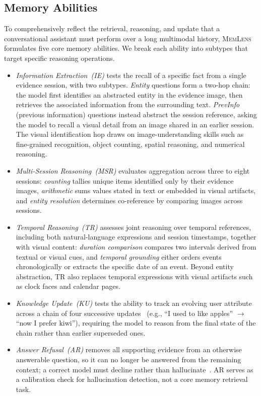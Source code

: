 \documentclass{article}
\newcommand{\bench}{\textsc{MemLens}}
\begin{document}
\subsection{Memory Abilities}
\label{subsec:formulation}
To comprehensively reflect the retrieval, reasoning, and update that a conversational assistant must perform over a long multimodal history, \bench{} formulates five core memory abilities. We break each ability into subtypes that target specific reasoning operations.
\begin{itemize}
    \item \textit{Information Extraction~(IE)} tests the recall of a specific fact from a single evidence session, with two subtypes. \emph{Entity} questions form a two-hop chain: the model first identifies an abstracted entity in the evidence image, then retrieves the associated information from the surrounding text. \emph{PrevInfo} (previous information) questions instead abstract the session reference, asking the model to recall a visual detail from an image shared in an earlier session. The visual identification hop draws on image-understanding skills such as fine-grained recognition, object counting, spatial reasoning, and numerical reasoning.
    \item \textit{Multi-Session Reasoning~(MSR)} evaluates aggregation across three to eight sessions: \emph{counting} tallies unique items identified only by their evidence images, \emph{arithmetic} sums values stated in text or embedded in visual artifacts, and \emph{entity resolution} determines co-reference by comparing images across sessions.
    \item \textit{Temporal Reasoning~(TR)} assesses joint reasoning over temporal references, including both natural-language expressions and session timestamps, together with visual content: \emph{duration comparison} compares two intervals derived from textual or visual cues, and \emph{temporal grounding} either orders events chronologically or extracts the specific date of an event. Beyond entity abstraction, TR also replaces temporal expressions with visual artifacts such as clock faces and calendar pages.
    \item \textit{Knowledge Update~(KU)} tests the ability to track an evolving user attribute across a chain of four successive updates~\cite{xu2024knowledge} (e.g., ``I used to like apples'' $\to$ ``now I prefer kiwi''), requiring the model to reason from the final state of the chain rather than earlier superseded ones.
    \item \textit{Answer Refusal~(AR)} removes all supporting evidence from an otherwise answerable question, so it can no longer be answered from the remaining context; a correct model must decline rather than hallucinate~\cite{zhang2024rtuning}. AR serves as a calibration check for hallucination detection, not a core memory retrieval task.
\end{itemize}
\end{document}
